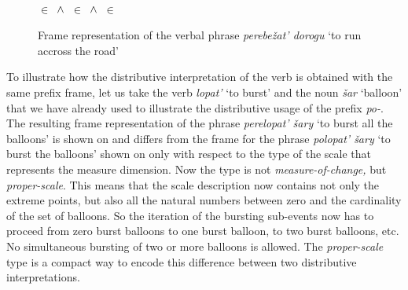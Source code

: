 \begin{figure}
\small
\begin{minipage}{0.6\textwidth}
\end{minipage}\hfill%
\begin{minipage}{0.35\textwidth}
\\
\vspace{0.3em}
 $\in$  $\,\wedge\,$  $\in$  $\,\wedge\,$  $\in$ 
\end{minipage}
\caption{Frame representation of the verbal phrase \textit{perebe\v{z}at' dorogu} `to run accross the road' \label{frame:cross:road}}
\end{figure}


To illustrate how the distributive interpretation of the verb is obtained with the same prefix frame, let us take the verb \textit{lopat'} `to burst' and the noun \textit{\v{s}ar} `balloon' that we have already used to illustrate the distributive usage of the prefix \textit{po-}. The resulting frame representation of the phrase \textit{perelopat' \v{s}ary} `to burst all the balloons' is shown on  and differs from the frame for the phrase \textit{polopat' \v{s}ary} `to burst the balloons' shown on  only with respect to the type of the scale that represents the measure dimension. Now the type is not \textit{measure-of-change,} but \textit{proper-scale}. This means that the scale description now contains not only the extreme points, but also all the natural numbers between zero and the cardinality of the set of balloons. So the iteration of the bursting sub-events now has to proceed from zero burst balloons to one burst balloon, to two burst balloons, etc. No simultaneous bursting of two or more balloons is allowed. The \textit{proper-scale} type is a compact way to encode this difference between two distributive interpretations.


